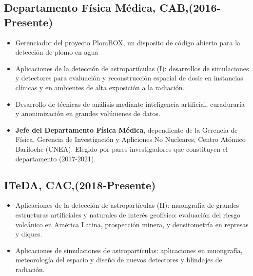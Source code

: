 \subsection*{Departamento Física Médica, CAB,(2016-Presente)}
\begin{itemize}
	\item Gerenciador del proyecto PlomBOX, un disposito de código abierto para la detección de plomo en agua
	\item Aplicaciones de la detección de astropartículas (I): desarrollos
		de simulaciones y detectores para evaluación y reconstrucción
		espacial de dosis en instancias clínicas y en ambientes de
		alta exposición a la radiación.
	\item Desarrollo de técnicas de análisis mediante inteligencia artificial, curaduraría y anonimización en grandes volúmenes de datos.
 	\item {\bf{Jefe del Departamento Física Médica}}, dependiente de la
		Gerencia de Física, Gerencia de Investigación y Apliciones No
		Nucleares, Centro Atómico Bariloche (CNEA). Elegido por pares
		investigadores que constituyen el departamento (2017-2021).
\end{itemize}

\subsection*{ITeDA, CAC,(2018-Presente)}
\begin{itemize}
	\item Aplicaciones de la detección de astropartículas (II): muongrafía de grandes estructuras artificiales y naturales de interés geofísico: evaluación del riesgo volcánico en América Latina, prospección minera, y densitometría en represas y diques.
	\item Aplicaciones de simulaciones de astropartículas: aplicaciones en muongrafía, meteorología del espacio y diseño de nuevos detectores y blindajes de radiación.
\end{itemize}


